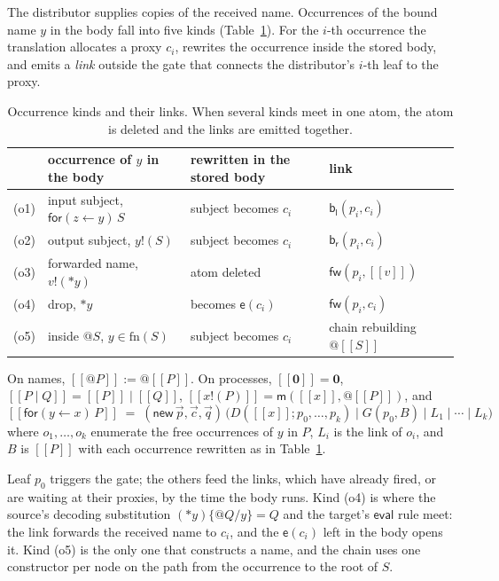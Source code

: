 \documentclass[acmsmall,screen,review,anonymous]{acmart}
\makeatletter
\newcommand{\quo}[1]{@#1}
\newcommand{\drp}[1]{{*}#1}
\newcommand{\inp}[3]{\mathsf{for}(#1 \leftarrow #2)\,#3}
\newcommand{\out}[2]{#1!(#2)}
\newcommand{\nil}{\mathbf{0}}
\newcommand{\enc}[1]{[\![#1]\!]}
\newcommand{\fn}{\mathrm{fn}}
\newcommand{\mm}{\mathsf{m}}
\newcommand{\fw}{\mathsf{fw}}
\newcommand{\bl}{\mathsf{b}_{\mathsf{l}}}
\newcommand{\br}{\mathsf{b}_{\mathsf{r}}}
\newcommand{\ev}{\mathsf{e}}
\makeatother
\begin{document}
The distributor supplies copies of the received name. Occurrences of the
bound name $y$ in the body fall into five kinds (Table~\ref{tab:links}). For
the $i$-th occurrence the translation allocates a proxy $c_{i}$, rewrites the
occurrence inside the stored body, and emits a \emph{link} outside the gate
that connects the distributor's $i$-th leaf to the proxy.

\begin{table}[t]
\small
\begin{tabular}{@{}llll@{}}
\toprule
 & occurrence of $y$ in the body & rewritten in the stored body & link\\
\midrule
(o1) & input subject, $\inp{z}{y}{S}$ & subject becomes $c_{i}$ & $\bl(p_{i},c_{i})$\\
(o2) & output subject, $\out{y}{S}$ & subject becomes $c_{i}$ & $\br(p_{i},c_{i})$\\
(o3) & forwarded name, $\out{v}{\drp{y}}$ & atom deleted & $\fw(p_{i},\enc{v})$\\
(o4) & drop, $\drp{y}$ & becomes $\ev(c_{i})$ & $\fw(p_{i},c_{i})$\\
(o5) & inside $\quo{S}$, $y \in \fn(S)$ & subject becomes $c_{i}$
     & chain rebuilding $\quo{\enc{S}}$\\
\bottomrule
\end{tabular}
\caption{Occurrence kinds and their links. When several kinds meet in one atom,
the atom is deleted and the links are emitted together.}
\label{tab:links}
\end{table}

\begin{definition}
\label{def:phase1}
On names, $\enc{\quo{P}} := \quo{\enc{P}}$. On processes,
$\enc{\nil} = \nil$, $\enc{P \mid Q} = \enc{P} \mid \enc{Q}$,
$\enc{\out{x}{P}} = \mm(\enc{x},\quo{\enc{P}})$, and
\[
  \enc{\inp{y}{x}{P}} \;=\;
  (\mathsf{new}\,\vec p,\vec c,\vec q)\,
  \big(D(\enc{x};p_{0},\dots,p_{k}) \mid G(p_{0}, B) \mid L_{1} \mid \cdots
  \mid L_{k}\big)
\]
where $o_{1},\dots,o_{k}$ enumerate the free occurrences of $y$ in $P$, $L_{i}$
is the link of $o_{i}$, and $B$ is $\enc{P}$ with each occurrence rewritten as
in Table~\ref{tab:links}.
\end{definition}

Leaf $p_{0}$ triggers the gate; the others feed the links, which have
already fired, or are waiting at their proxies, by the time the body runs.
Kind (o4) is where the source's decoding substitution
$(\drp{y})\{\quo{Q}/y\} = Q$ and the target's $\mathsf{eval}$ rule meet:
the link forwards the received name to $c_{i}$, and the $\ev(c_{i})$ left in
the body opens it. Kind (o5) is the only one that constructs a name, and the
chain uses one constructor per node on the path from the occurrence to the
root of $S$.
\end{document}
